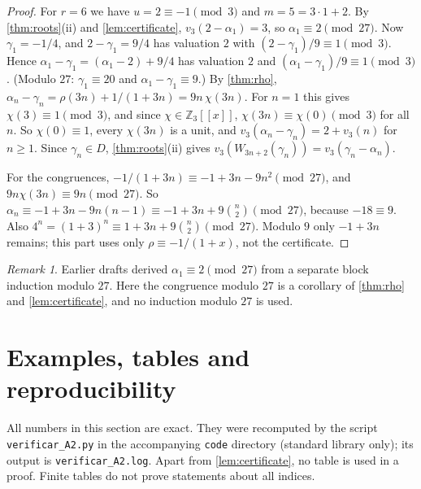 \documentclass[11pt,reqno]{amsart}
\theoremstyle{definition}
\theoremstyle{remark}
\newtheorem{remark}[theorem]{Remark}
\theoremstyle{plain}
\newcommand{\Z}{\mathbb Z}
\begin{document}
\begin{proof}
For $r=6$ we have $u=2\equiv-1\pmod 3$ and $m=5=3\cdot1+2$. By \cref{thm:roots}(ii) and \cref{lem:certificate}, $v_3(2-\alpha_1)=3$, so $\alpha_1\equiv2\pmod{27}$. Now $\gamma_1=-1/4$, and $2-\gamma_1=9/4$ has valuation $2$ with $(2-\gamma_1)/9\equiv1\pmod3$. Hence $\alpha_1-\gamma_1=(\alpha_1-2)+9/4$ has valuation $2$ and $(\alpha_1-\gamma_1)/9\equiv1\pmod 3$. (Modulo $27$: $\gamma_1\equiv20$ and $\alpha_1-\gamma_1\equiv9$.) By \cref{thm:rho}, $\alpha_n-\gamma_n=\rho(3n)+1/(1+3n)=9n\,\chi(3n)$. For $n=1$ this gives $\chi(3)\equiv1\pmod 3$, and since $\chi\in\Z_3[[x]]$, $\chi(3n)\equiv\chi(0)\pmod 3$ for all $n$. So $\chi(0)\equiv1$, every $\chi(3n)$ is a unit, and $v_3(\alpha_n-\gamma_n)=2+v_3(n)$ for $n\ge1$. Since $\gamma_n\in D$, \cref{thm:roots}(ii) gives $v_3(W_{3n+2}(\gamma_n))=v_3(\gamma_n-\alpha_n)$.

For the congruences, $-1/(1+3n)\equiv-1+3n-9n^2\pmod{27}$, and $9n\chi(3n)\equiv9n\pmod{27}$. So $\alpha_n\equiv-1+3n-9n(n-1)\equiv-1+3n+9\binom n2\pmod{27}$, because $-18\equiv9$. Also $4^n=(1+3)^n\equiv1+3n+9\binom n2\pmod{27}$. Modulo $9$ only $-1+3n$ remains; this part uses only $\rho\equiv-1/(1+x)$, not the certificate.
\end{proof}

\begin{remark}
Earlier drafts derived $\alpha_1\equiv2\pmod{27}$ from a separate block induction modulo $27$. Here the congruence modulo $27$ is a corollary of \cref{thm:rho} and \cref{lem:certificate}, and no induction modulo $27$ is used.
\end{remark}

\section{Examples, tables and reproducibility}\label{sec:examples}

All numbers in this section are exact. They were recomputed by the script \texttt{verificar\_A2.py} in the accompanying \texttt{code} directory (standard library only); its output is \texttt{verificar\_A2.log}. Apart from \cref{lem:certificate}, no table is used in a proof. Finite tables do not prove statements about all indices.
\end{document}

